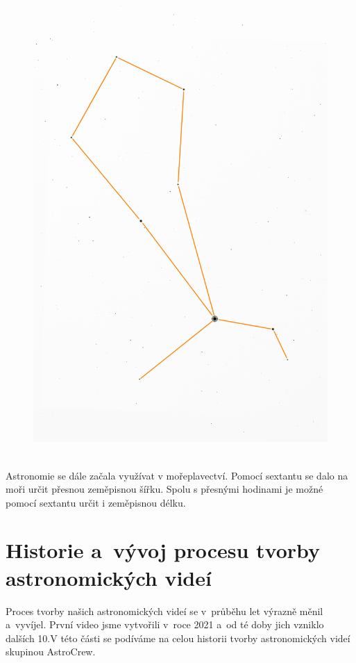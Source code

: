 \documentclass[12pt,a4paper,titlepage]{article}
\begin{document}
\begin{figure}[H]
	\hspace{.8cm}
	\begin{minipage}{.45\textwidth}
	  \centering
	  \includegraphics[width=1\linewidth]{2025.png}
	  ~\label{fig:test2}
	\end{minipage}
\end{figure}

Astronomie se dále začala využívat v mořeplavectví. Pomocí sextantu se dalo na moři určit přesnou zeměpisnou šířku. Spolu s přesnými hodinami je možné pomocí sextantu určit i zeměpisnou délku.

\section{Historie a~vývoj procesu tvorby astronomických videí}
Proces tvorby našich astronomických videí se v~průběhu let výrazně měnil a~vyvíjel. První video jsme vytvořili v~roce 2021 a~od té doby jich vzniklo dalších 10.V této části se podíváme na celou historii tvorby astronomických videí skupinou AstroCrew.
\end{document}
